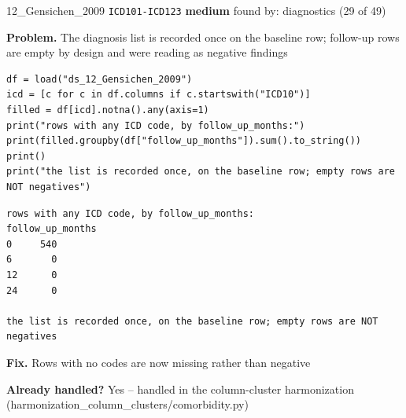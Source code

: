 \documentclass[9pt, t, handout]{beamer}
\newcommand{\ans}[1]{\textcolor{structure.fg}{#1}}
\begin{document}
\begin{frame}[fragile]{12\_Gensichen\_2009 \quad \texttt{ICD101-ICD123}}
  {\scriptsize\textcolor{blue!55!black}{\textbf{medium}} \quad
   found by: diagnostics \quad (29 of 49)}
  \vspace{3pt}

  {\footnotesize \textbf{Problem.} The diagnosis list is recorded once on the baseline row; follow-up rows are empty by design and were reading as negative findings}
  \vspace{4pt}

  \begin{Verbatim}[fontsize=\tiny, frame=single, framesep=2pt, label=\tiny reproduce]
df = load("ds_12_Gensichen_2009")
icd = [c for c in df.columns if c.startswith("ICD10")]
filled = df[icd].notna().any(axis=1)
print("rows with any ICD code, by follow_up_months:")
print(filled.groupby(df["follow_up_months"]).sum().to_string())
print()
print("the list is recorded once, on the baseline row; empty rows are NOT negatives")
  \end{Verbatim}
  \begin{Verbatim}[fontsize=\tiny, frame=single, framesep=2pt, label=\tiny output]
rows with any ICD code, by follow_up_months:
follow_up_months
0     540
6       0
12      0
24      0

the list is recorded once, on the baseline row; empty rows are NOT negatives
  \end{Verbatim}
  \vspace{2pt}

  {\footnotesize \textbf{Fix.} Rows with no codes are now missing rather than negative}
  \vspace{2pt}

  {\footnotesize \textbf{Already handled?} \ans{Yes} -- handled in the column-cluster harmonization
   (harmonization\_column\_clusters/comorbidity.py)}
\end{frame}
\end{document}
